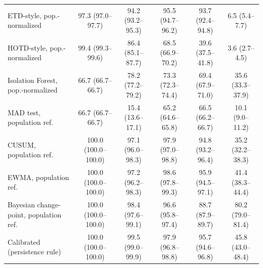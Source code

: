 \begin{table}[t]
{\begin{tabular}{lccccc}
\hline
ETD-style, pop.-normalized & 97.3 (97.0--97.7) & 94.2 (93.2--95.3) & 95.5 (94.7--96.2) & 93.7 (92.4--94.8) & 6.5 (5.4--7.7) \\
HOTD-style, pop.-normalized & 99.4 (99.3--99.6) & 86.4 (85.1--87.7) & 68.5 (66.9--70.2) & 39.6 (37.5--41.8) & 3.6 (2.7--4.5) \\
Isolation Forest, pop.-normalized & 66.7 (66.7--66.7) & 78.2 (77.2--79.2) & 73.3 (72.3--74.4) & 69.4 (67.9--71.0) & 35.6 (33.3--37.9) \\
\hline
MAD test, population ref. & 66.7 (66.7--66.7) & 15.4 (13.6--17.1) & 65.2 (64.6--65.8) & 66.5 (66.2--66.7) & 10.1 (9.0--11.2) \\
CUSUM, population ref. & 100.0 (100.0--100.0) & 97.1 (96.0--98.3) & 97.9 (97.0--98.8) & 94.8 (93.2--96.4) & 35.2 (32.2--38.3) \\
EWMA, population ref. & 100.0 (100.0--100.0) & 97.2 (96.2--98.3) & 98.6 (97.8--99.3) & 95.9 (94.5--97.1) & 41.4 (38.3--44.4) \\
Bayesian change-point, population ref. & 100.0 (100.0--100.0) & 98.4 (97.6--99.1) & 96.6 (95.8--97.4) & 88.7 (87.9--89.7) & 80.2 (79.0--81.4) \\
Calibrated (persistence rule) & 100.0 (100.0--100.0) & 99.5 (99.0--99.9) & 97.9 (96.8--98.8) & 95.7 (94.6--96.8) & 45.8 (43.0--48.4) \\
\hline
\end{tabular}}
\end{table}


